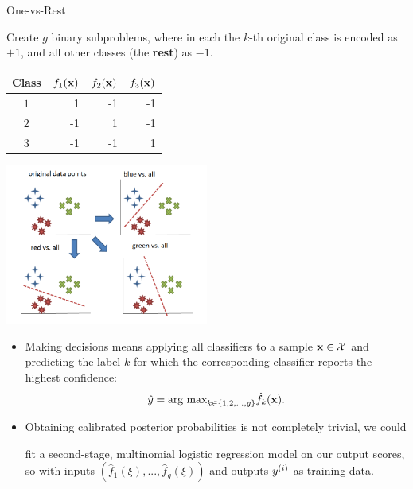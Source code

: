 \documentclass[11pt,compress,t,notes=noshow, xcolor=table]{beamer}
\begin{document}
\begin{vbframe}{One-vs-Rest }


Create $g$ binary subproblems, where in each the $k$-th original class is encoded as $+1$, and all other classes (the \textbf{rest}) as $- 1$.


\begin{table}[]
  \footnotesize
  \begin{tabular}{|c|r|r|r|} \hline
  \textbf{Class}  & \textbf{$f_1{(\mathbf{x})}$} & \textbf{$f_2{(\mathbf{x})}$}  & \textbf{$f_3{(\mathbf{x})}$} \\ \hline
  \textbf{$1$}  &   1                 &  -1                   &  -1                   \\ \hline
  \textbf{$2$}  &  -1                 &  1                   & -1                   \\ \hline
  \textbf{$3$}  &  -1                 & -1                   &  1                   \\ \hline
  \end{tabular}
  \end{table}


    \begin{center}
    \includegraphics[width=0.5\textwidth]{figure_man/one_vs_all.png}
    \end{center}

  \begin{itemize}
    \item Making decisions means applying all classifiers to a sample $\mathbf{x} \in \mathcal{X}$ and predicting the label $k$ for which the corresponding classifier reports the highest confidence: 
    $$
      \hat y = \text{arg max}_{k \in \{1, 2, ..., g\}} \hat f_k(\mathbf{x}). 
    $$

    \item Obtaining calibrated posterior probabilities is not completely trivial, we could

    fit a second-stage, multinomial logistic regression model on our output scores, so with inputs $\left(\hat f_1(\xi), ..., \hat f_g(\xi)\right)$ and outputs $y^{(i)}$ as training data. 

  \end{itemize}
  \vspace*{0.2cm}


\end{vbframe}
\end{document}
